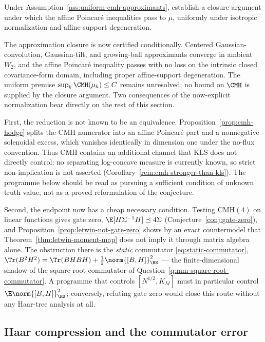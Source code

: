 \documentclass[../../main.tex]{subfiles}
\begin{document}
\begin{question}
\label{q:cmh-approximation}
Under Assumption~\ref{ass:uniform-cmh-approximants}, establish a closure argument under which the
affine Poincar\'e inequalities pass to $\mu$, uniformly under isotropic normalization and
affine-support degeneration.
\end{question}

The approximation closure is now certified conditionally. Centered Gaussian-convolution,
Gaussian-tilt, and growing-ball approximants converge in ambient $W_2$, and the affine
Poincar\'e inequality passes with no loss on the intrinsic closed covariance-form domain,
including proper affine-support degeneration. The uniform premise
$\sup_k\CMH(\mu_k)\le C$ remains unresolved; no bound on $\CMH$ is supplied by the closure
argument. Two consequences of the now-explicit normalization bear directly on the rest of this
section.

First, the reduction is not known to be an equivalence. Proposition~\ref{prop:cmh-hodge} splits
the CMH numerator into an affine Poincar\'e part and a nonnegative solenoidal excess, which
vanishes identically in dimension one under the no-flux convention.  Thus CMH contains an
additional channel that KLS does not directly control; no separating log-concave measure is
currently known, so strict non-implication is not asserted
(Corollary~\ref{rem:cmh-stronger-than-kls}). The programme below should be read as pursuing a
sufficient condition of unknown truth value, not as a proved reformulation of the conjecture.

Second, the endpoint now has a cheap necessary condition. Testing $\mathrm{CMH}(4)$ on linear
functions gives gate zero, $\E[H\Sigma^{-1}H]\preceq4\Sigma$
(Conjecture~\ref{conj:gate-zero}), and Proposition~\ref{prop:letwin-not-gate-zero} shows by an
exact countermodel that Theorem~\ref{thm:letwin-moment-map} does not imply it through matrix
algebra alone. The obstruction there is the \emph{static} commutator
\eqref{eq:static-commutator}, $\Tr(B^2H^2)=\Tr(BHBH)+\tfrac12\norm{[B,H]}_{\HS}^2$ --- the
finite-dimensional shadow of the square-root commutator of
Question~\ref{q:mm-square-root-commutator}. A programme that controls
$[N^{1/2},K_M]$ must in particular control $\E\norm{[B,H]}_{\HS}^2$; conversely, refuting gate
zero would close this route without any Haar-tree analysis at all.

\subsection{Haar compression and the commutator error}
\end{document}
